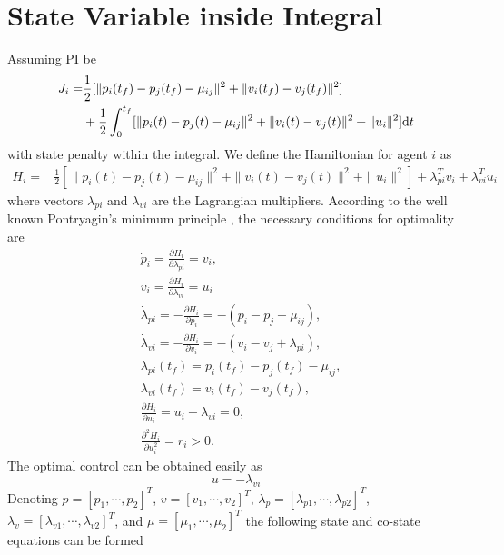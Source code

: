 \documentclass[letterpaper, 10 pt, conference,onecolumn]{ieeeconf}  %
\begin{document}
\section{State Variable inside Integral}
Assuming PI be
\begin{align}
J_i=&\frac{1}{2}[\|p_i(t_f)-p_j(t_f)-\mu_{ij}\|^2+ \|v_i(t_f)-v_j(t_f)\|^2]\notag\\
&+\frac{1}{2}\int^{t_f}_0 [\|p_i(t)-p_j(t)-\mu_{ij}\|^2+ \|v_i(t)-v_j(t)\|^2+ \|u_i\|^2]  \mbox{d}t
\end{align}
with state penalty within the integral. We define the Hamiltonian for agent $i$ as
\begin{align}
H_i=&\frac{1}{2}[\|p_i(t)-p_j(t)-\mu_{ij}\|^2+ \|v_i(t)-v_j(t)\|^2+ \|u_i\|^2]+ \lambda_{pi}^Tv_i+
\lambda_{vi}^Tu_i
\end{align}
where vectors $\lambda_{pi}$ and $\lambda_{vi}$ are the Lagrangian multipliers. According to the well known Pontryagin's minimum principle \cite{pontreiiagin1962mathematical}, the necessary conditions for optimality are
\begin{subequations}\begin{align}
&\dot{p}_{i}=\frac{\partial H_i}{\partial \lambda_{pi}}=v_i,\label{NecPi}\\ &\dot{v}_{i}=\frac{\partial H_i}{\partial \lambda_{vi}}=u_i\label{NecPi1}\\
&\dot{\lambda}_{pi}=-\frac{\partial H_i}{\partial p_{i}}= -(p_i-p_j-\mu_{ij}),\\
&\dot{\lambda}_{vi}=-\frac{\partial H_i}{\partial v_{i}}= -(v_i-v_j+\lambda_{pi}),\label{NecPi2}\\
&\lambda_{pi}(t_f)= p_{i}(t_f)-p_{j}(t_f)-\mu_{ij},\label{NecPi3}\\
&\lambda_{vi}(t_f)= v_{i}(t_f)-v_{j}(t_f),\label{NecPi4}\\
&\frac{\partial H_i}{\partial u_i}=u_i+\lambda_{vi} =0,\\ &\frac{\partial^2 H_i}{\partial u_i^2}=r_i>0.\label{NecPi5}
\end{align}
\end{subequations}
The optimal control can be obtained easily as
\[u=-\lambda_{vi}\]
Denoting $p=[p_1,\cdots,p_2]^T$, $v=[v_1,\cdots,v_2]^T$, $\lambda_p=[\lambda_{p1},\cdots,\lambda_{p2}]^T$,  $\lambda_v=[\lambda_{v1},\cdots,\lambda_{v2}]^T$, and $\mu=[\mu_1,\cdots,\mu_2]^T$ the following state and co-state equations can be formed
\end{document}
